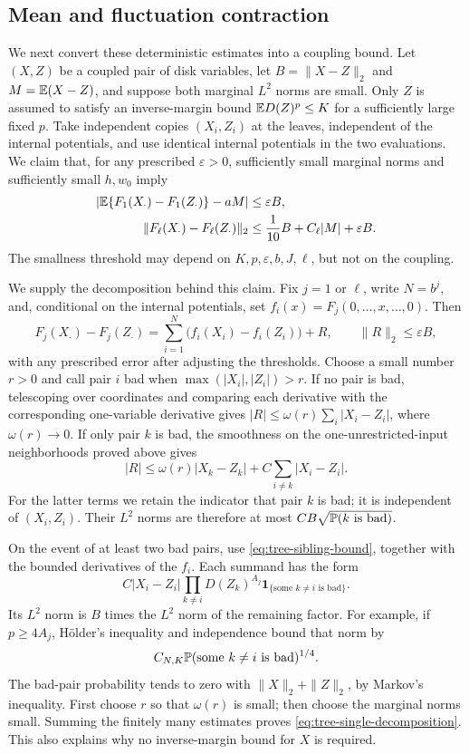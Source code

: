 \subsection{Mean and fluctuation contraction}

We next convert these deterministic estimates into a coupling bound.
Let $(X,Z)$ be a coupled pair of disk variables, let
$B=\|X-Z\|_2$ and $M=\mathbb E(X-Z)$, and suppose both marginal $L^2$
norms are small.  Only $Z$ is assumed to satisfy an inverse-margin
bound $\mathbb E D(Z)^p\le K$ for a sufficiently large fixed $p$.
Take independent copies $(X_i,Z_i)$ at the leaves, independent of
the internal potentials, and use identical internal potentials in
the two evaluations.  We claim that, for any prescribed
$\varepsilon>0$, sufficiently small marginal norms and sufficiently
small $h,w_0$ imply
\begin{align}
 \left|\mathbb E\{F_1(X_\cdot)-F_1(Z_\cdot)\}-aM\right|
     &\le\varepsilon B,\label{eq:tree-mean-contraction}\\
 \|F_\ell(X_\cdot)-F_\ell(Z_\cdot)\|_2
     &\le\frac1{10}B+C_\ell|M|+\varepsilon B.
       \label{eq:tree-fluctuation-contraction}
\end{align}
The smallness threshold may depend on $K,p,\varepsilon,b,J,\ell$,
but not on the coupling.

We supply the decomposition behind this claim.  Fix $j=1$ or $\ell$,
write $N=b^j$, and, conditional on the internal potentials, set
$f_i(x)=F_j(0,\ldots,x,\ldots,0)$.  Then
\begin{equation}\label{eq:tree-single-decomposition}
 F_j(X_\cdot)-F_j(Z_\cdot)
 =\sum_{i=1}^{N}\bigl(f_i(X_i)-f_i(Z_i)\bigr)+R,
 \qquad \|R\|_2\le\varepsilon B,
\end{equation}
with any prescribed error after adjusting the thresholds.
Choose a small number $r>0$ and call pair $i$ bad when
$\max(|X_i|,|Z_i|)>r$.  If no pair is bad, telescoping over
coordinates and comparing each derivative with the corresponding
one-variable derivative gives $|R|\le\omega(r)\sum_i|X_i-Z_i|$,
where $\omega(r)\to0$.  If only pair $k$ is bad, the smoothness
on the one-unrestricted-input neighborhoods proved above gives
\[
 |R|\le\omega(r)|X_k-Z_k|+C\sum_{i\ne k}|X_i-Z_i|.
\]
For the latter terms we retain the indicator that pair $k$ is bad;
it is independent of $(X_i,Z_i)$.  Their $L^2$ norms are therefore
at most $CB\sqrt{\mathbb P(k\text{ is bad})}$.

On the event of at least two bad pairs, use
\eqref{eq:tree-sibling-bound}, together with the bounded derivatives
of the $f_i$.  Each summand has the form
\[
 C|X_i-Z_i|\prod_{k\ne i}D(Z_k)^{A_j}
   \mathbf1_{\{\text{some }k\ne i\text{ is bad}\}}.
\]
Its $L^2$ norm is $B$ times the $L^2$ norm of the remaining factor.
For example, if $p\ge4A_j$, H\"older's inequality and independence
bound that norm by
\[
 C_{N,K}\mathbb P(\text{some }k\ne i\text{ is bad})^{1/4}.
\]
The bad-pair probability tends to zero with
$\|X\|_2+\|Z\|_2$, by Markov's inequality.  First choose $r$ so
that $\omega(r)$ is small; then choose the marginal norms small.
Summing the finitely many estimates proves
\eqref{eq:tree-single-decomposition}.  This also explains why no
inverse-margin bound for $X$ is required.

